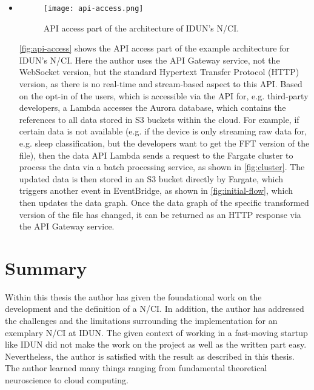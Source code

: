 \begin{itemize}
  \item \begin{figure}[!ht]
          \centering
          \hspace*{0.4in}
          \texttt{[image: api-access.png]}
          \caption{API access part of the architecture of IDUN's N/CI.}
          \label{fig:api-access}
        \end{figure}

        \autoref{fig:api-access} shows the API access part of the example architecture for IDUN's N/CI. Here the author uses the API Gateway service, not the WebSocket version, but the standard Hypertext Transfer Protocol (HTTP) version, as there is no real-time and stream-based aspect to this API. Based on the opt-in of the users, which is accessible via the API for, e.g. third-party developers, a Lambda accesses the Aurora database, which contains the references to all data stored in S3 buckets within the cloud. For example, if certain data is not available (e.g. if the device is only streaming raw data for, e.g. sleep classification, but the developers want to get the FFT version of the file), then the data API Lambda sends a request to the Fargate cluster to process the data via a batch processing service, as shown in \autoref{fig:cluster}. The updated data is then stored in an S3 bucket directly by Fargate, which triggers another event in EventBridge, as shown in \autoref{fig:initial-flow}, which then updates the data graph. Once the data graph of the specific transformed version of the file has changed, it can be returned as an HTTP response via the API Gateway service.

\end{itemize}

\section{Summary}
\label{chapter5-summary}

Within this thesis the author has given the foundational work on the development and the definition of a N/CI. In addition, the author has addressed the challenges and the limitations surrounding the implementation for an exemplary N/CI at IDUN. The given context of working in a fast-moving startup like IDUN did not make the work on the project as well as the written part easy. Nevertheless, the author is satisfied with the result as described in this thesis. The author learned many things ranging from fundamental theoretical neuroscience to cloud computing.

